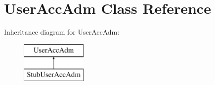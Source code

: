 \hypertarget{classUserAccAdm}{\section{User\-Acc\-Adm Class Reference}
\label{dd/d35/classUserAccAdm}
}
Inheritance diagram for User\-Acc\-Adm\-:\begin{figure}[H]
\begin{center}
\leavevmode
\includegraphics[height=2.000000cm]{dd/d35/classUserAccAdm}
\end{center}
\end{figure}
